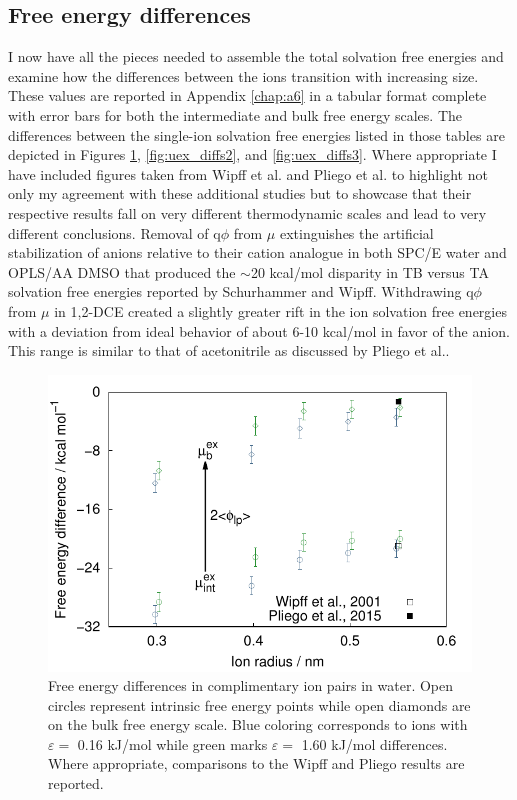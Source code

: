 \begin{tatb}
  \subsection{\label{ch6:sec2:level4}Free energy differences}
  I now have all the pieces needed to assemble the total solvation free energies and examine how the differences between the ions transition with increasing size. 
  These values are reported in Appendix \ref{chap:a6} in a tabular format complete with error bars for both the intermediate and bulk free energy scales. The 
  differences between the single-ion solvation free energies listed in those tables are depicted in Figures \ref{fig:uex_diffs1}, \ref{fig:uex_diffs2}, and 
  \ref{fig:uex_diffs3}. Where appropriate I have included figures taken from Wipff et al.\cite{wipff1999tatb} and Pliego et al.\cite{pliego2015ccqct} to highlight not
  only my agreement with these additional studies but to showcase that their respective results fall on very different thermodynamic scales and lead to very different
  conclusions. Removal of q$\phi$ from $\mu$ extinguishes the artificial stabilization of anions relative to their cation analogue in both 
  SPC/E water and OPLS/AA DMSO that produced the $\sim$20 kcal/mol disparity in TB\sur{-} versus TA\sur{+} solvation free energies reported by Schurhammer and Wipff.
  Withdrawing q$\phi$ from $\mu$ in 1,2-DCE created a slightly greater rift in the ion solvation free energies with a deviation from ideal
  behavior of about 6-10 kcal/mol in favor of the anion. This range is similar to that of acetonitrile as discussed by Pliego et al.\cite{pliego2015ccqct}.  

\begin{figure} 
 \includegraphics[width=0.98\linewidth]{images/tatb/wat_free_energy.pdf}
 \caption[Free energy differences in water]{\label{fig:uex_diffs1}Free energy differences in complimentary ion pairs in water. Open circles represent 
 intrinsic free energy points while open diamonds are on the bulk free energy scale. Blue coloring corresponds to ions with $\varepsilon =$ 0.16 kJ/mol 
 while green marks $\varepsilon =$ 1.60 kJ/mol differences. Where appropriate, comparisons to the Wipff and Pliego results are reported.}
\end{figure}


\end{tatb}
